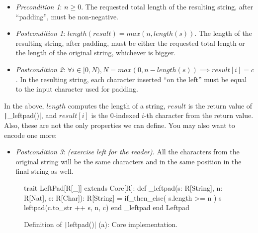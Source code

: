 \documentclass[11pt]{article}
\newcommand{\ScalaI}[1]{\texttt|#1|}
\begin{document}
\newcommand{\leftpadprea} {$ n \geqslant 0 $}
\newcommand{\leftpadposta}{$ length(result) = max(n, length(s)) $} 
\newcommand{\leftpadpostb}{$ \forall i \in [0, N), N = max(0, n - length(s)) \implies result[i] = c $}

\begin{itemize}
  \item \textit{Precondition 1}:  \leftpadprea.\newline
  The requested total length of the resulting string, after ``padding'', must be non-negative.

  \item \textit{Postcondition 1}: \leftpadposta.\newline
  The length of the resulting string, after padding, must be either the requested total length or the length of the original string, whichever is bigger.

  \item \textit{Postcondition 2}: \leftpadpostb.\newline
  In the resulting string, each character inserted ``on the left'' must be equal to the input character used for padding.  
\end{itemize}

\noindent In the above, $length$ computes the length of a string, $result$ is the return value of \ScalaI{_leftpad()}, and $result[i]$ is the $0$-indexed $i$-th character from the return value. Also, these are not the only properties we can define. You may also want to encode one more: 

\begin{itemize}
  \item \textit{Postcondition 3}: \textit{(exercise left for the reader)}.\newline
  All the characters from the original string will be the same characters and in the same position in the final string as well.

\end{itemize}


\begin{figure}[tb]
\begin{ScalaBlock}
trait LeftPad[R[_]] extends Core[R]:
  def _leftpad(s: R[String], n: R[Nat], c: R[Char]): R[String] =
    if_then_else( s.length >= n ) {
      s
    } {
      leftpad(c.to_str ++ s, n, c)
    }
  end _leftpad
end Leftpad
\end{ScalaBlock}
\caption{Definition of \ScalaI{leftpad()} (a): Core implementation.}
\label{fig:props:leftpad:a}
\hrulefill
\end{figure}
\end{document}
